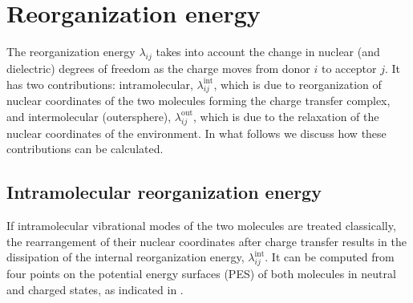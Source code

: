\section{Reorganization energy}
\label{sec:reorganization}

The reorganization energy $\lambda_{ij}$ takes into 
account the change in  nuclear (and dielectric) degrees of freedom as the charge 
moves from donor $i$ to acceptor $j$. It has two contributions: intramolecular, 
$\lambda^\text{int}_{ij}$, which is due to reorganization of nuclear coordinates 
of the two molecules forming the charge transfer complex, and intermolecular 
(outersphere), $\lambda^\text{out}_{ij}$, which is due to the relaxation of the 
nuclear coordinates of the environment. In what follows we discuss how these 
contributions can be calculated.

\subsection{Intramolecular reorganization energy}
\label{sec:eintramolecular}
If intramolecular vibrational modes of the two molecules are treated 
classically, the rearrangement of their nuclear coordinates after charge 
transfer results in the dissipation of the internal reorganization energy, 
$\lambda_{ij}^\text{int}$. It can be computed from four points on the potential 
energy surfaces (PES) of both molecules in neutral and charged states, as 
indicated in . 

